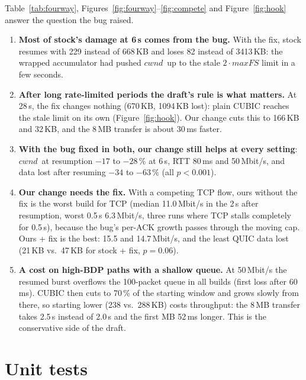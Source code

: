 \documentclass[11pt,a4paper]{article}
\newcommand{\maxfs}{\ensuremath{\mathit{maxFS}}}
\newcommand{\cwnd}{\ensuremath{\mathit{cwnd}}}
\begin{document}
Table~\ref{tab:fourway}, Figures~\ref{fig:fourway}--\ref{fig:compete} and Figure~\ref{fig:hook} answer
the question the bug raised.
\begin{enumerate}
  \item \textbf{Most of stock's damage at 6\,s comes from the bug.} With the fix,
        stock resumes with 229 instead of 668\,KB and loses 82 instead of
        3413\,KB: the wrapped accumulator had pushed \cwnd\ up to the stale
        $2\cdot\maxfs$ limit in a few seconds.
  \item \textbf{After long rate-limited periods the draft's rule is what
        matters.} At 28\,s, the fix changes nothing (670\,KB, 1094\,KB lost):
        plain CUBIC reaches the stale limit on its own
        (Figure~\ref{fig:hook}). Our change cuts this to 166\,KB and 32\,KB,
        and the 8\,MB transfer is about 30\,ms faster.
  \item \textbf{With the bug fixed in both, our change still helps at every
        setting}: \cwnd\ at resumption $-17$ to $-28\,\%$ at 6\,s, RTT 80\,ms and
        50\,Mbit/s, and data lost after resuming $-34$ to $-63\,\%$
        (all $p < 0.001$).
  \item \textbf{Our change needs the fix.} With a competing TCP flow, ours
        without the fix is the worst build for TCP (median 11.0\,Mbit/s in the
        2\,s after resumption, worst 0.5\,s 6.3\,Mbit/s, three runs where TCP
        stalls completely for 0.5\,s), because the bug's per-ACK growth passes through
        the moving cap. Ours + fix is the best: 15.5 and 14.7\,Mbit/s, and the
        least QUIC data lost (21\,KB vs.\ 47\,KB for stock + fix, $p = 0.06$).
  \item \textbf{A cost on high-BDP paths with a shallow queue.} At 50\,Mbit/s
        the resumed burst overflows the 100-packet queue in all builds (first
        loss after 60\,ms). CUBIC then cuts to 70\,\% of the starting window and
        grows slowly from there, so starting lower (238 vs.\ 288\,KB) costs
        throughput: the 8\,MB transfer takes 2.5\,s instead of 2.0\,s and the
        first MB 52\,ms longer. This is the conservative side of the draft.
\end{enumerate}

\section{Unit tests}
\label{sec:tests}
\end{document}
